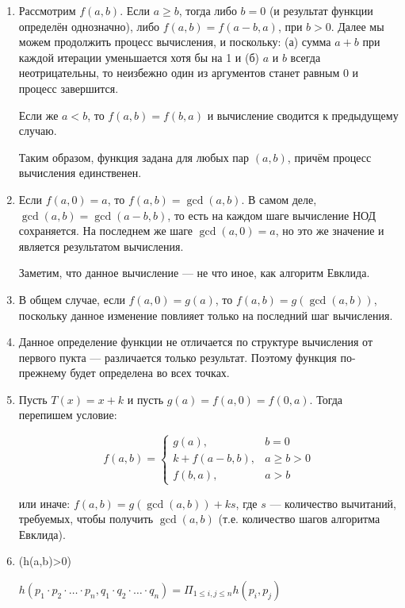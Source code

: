 
\begin{enumerate}
\item Рассмотрим $f(a,b)$. Если $a \ge b$, тогда либо $b = 0$ (и результат функции определён однозначно),
либо $f(a,b) = f(a-b,a)$, при $b > 0$. Далее мы можем продолжить процесс вычисления, и поскольку:
(а) сумма $a+b$ при каждой итерации уменьшается хотя бы на 1 и (б) $a$ и $b$ всегда неотрицательны, 
то неизбежно один из аргументов станет равным $0$ и процесс завершится. 

Если же $a < b$, то $f(a,b) = f(b,a)$ и вычисление сводится к предыдущему случаю.

Таким образом, функция задана для любых пар $(a,b)$, причём процесс вычисления единственен.

\item Если $f(a,0) = a$, то $f(a,b) = \gcd(a,b)$.
В самом деле, $\gcd(a,b) = \gcd(a-b,b)$, то есть на каждом шаге вычисление НОД сохраняется.
На последнем же шаге $\gcd(a,0) = a$, но это же значение и является результатом вычисления.

Заметим, что данное вычисление --- не что иное, как алгоритм Евклида.

\item В общем случае, если $f(a,0) = g(a)$, то $f(a,b) = g(\gcd(a,b))$, поскольку данное 
изменение повлияет только на последний шаг вычисления.

\item Данное определение функции не отличается по структуре вычисления от первого пукта ---
различается только результат. Поэтому функция по-прежнему будет определена во всех точках.

\item Пусть $T(x) = x + k$ и пусть $g(a) = f(a,0) = f(0,a)$. Тогда перепишем условие:

$$f(a,b) = \left\{\begin{array}{ll}
   g(a), & b = 0\\
   k+f(a-b,b), & a \ge b > 0\\
   f(b,a), & a > b\end{array}\right.$$

или иначе: $f(a,b) = g(\gcd(a,b)) + ks$, где $s$ --- количество вычитаний, требуемых,
чтобы получить $\gcd(a,b)$ (т.е. количество шагов алгоритма Евклида). 

\item (h(a,b)>0)

$h(p_1\cdot p_2\cdot \ldots \cdot p_n, q_1 \cdot q_2 \cdot \ldots \cdot q_n) =
\Pi_{1 \le i,j \le n} h(p_i, p_j)$


\end{enumerate}
